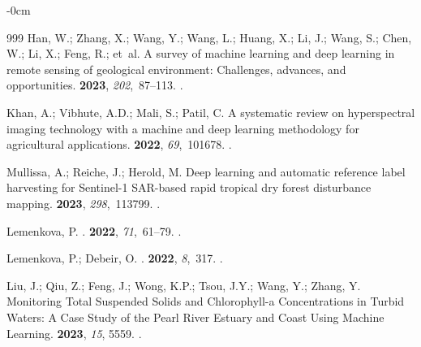 \documentclass[coasts,article,accept,pdftex,oneauthor]{Definitions/mdpi}
\begin{document}
\begin{adjustwidth}{-\extralength}{0cm}
\begin{thebibliography}{999}
Han, W.; Zhang, X.; Wang, Y.; Wang, L.; Huang, X.; Li, J.; Wang, S.; Chen, W.;
  Li, X.; Feng, R.;  et~al.
\newblock A survey of machine learning and deep learning in remote sensing of
  geological environment: Challenges, advances, and opportunities.
 {\bf 2023},
  {\em 202},~87--113.
.

Khan, A.; Vibhute, A.D.; Mali, S.; Patil, C.
\newblock A systematic review on hyperspectral imaging technology with a
  machine and deep learning methodology for agricultural applications.
 {\bf 2022}, {\em 69},~101678.
.

Mullissa, A.; Reiche, J.; Herold, M.
\newblock Deep learning and automatic reference label harvesting for Sentinel-1
  SAR-based rapid tropical dry forest disturbance mapping.
 {\bf 2023}, {\em 298},~113799.
.

Lemenkova, P.
.
 {\bf 2022}, {\em
  71},~61--79.
.

Lemenkova, P.; Debeir, O.
.
 {\bf 2022}, {\em 8},~317.
.

Liu, J.; Qiu, Z.; Feng, J.; Wong, K.P.; Tsou, J.Y.; Wang, Y.; Zhang, Y.
\newblock Monitoring Total Suspended Solids and Chlorophyll-a Concentrations in
  Turbid Waters: A Case Study of the Pearl River Estuary and Coast Using
  Machine Learning.
 {\bf 2023}, {\em 15}, 5559.
.


\end{thebibliography}
\end{adjustwidth}
\end{document}
